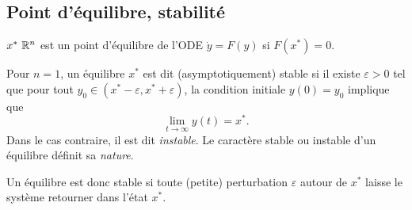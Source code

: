 \subsection{Point d'équilibre, stabilité} 

\begin{definition}
  $x^* \ \mathbb{R}^n$ est un point d'équilibre de l'ODE $\dot y = F(y)$ si $F(x^*) = 0$.
\end{definition}

\begin{definition}[Stabilité ($n = 1$)]
  Pour $n = 1$, un équilibre $x^*$ est dit (asymptotiquement) stable si il existe $\varepsilon > 0$ tel que pour tout $y_0 \in (x^* - \varepsilon, x^* + \varepsilon)$, la condition initiale $y(0) = y_0$ implique que 
  $$
  \lim_{t \rightarrow \infty} y(t) = x^*.
  $$
  Dans le cas contraire, il est dit {\em instable}. Le caractère stable ou instable d'un équilibre définit sa {\em nature}.
\end{definition}

\remark
Un équilibre est donc stable si toute (petite) perturbation $\varepsilon$ autour de $x^*$ laisse le système retourner dans l'état $x^*$.


